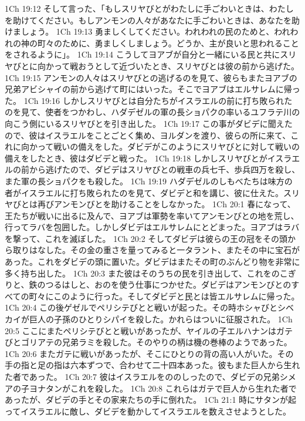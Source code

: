 1Ch 19:12  そして言った、「もしスリヤびとがわたしに手ごわいときは、わたしを助けてください。もしアンモンの人々があなたに手ごわいときは、あなたを助けましょう。
1Ch 19:13  勇ましくしてください。われわれの民のためと、われわれの神の町々のために、勇ましくしましょう。どうか、主が良いと思われることをされるように」。
1Ch 19:14  こうしてヨアブが自分と一緒にいる民と共にスリヤびとに向かって戦おうとして近づいたとき、スリヤびとは彼の前から逃げた。
1Ch 19:15  アンモンの人々はスリヤびとの逃げるのを見て、彼らもまたヨアブの兄弟アビシャイの前から逃げて町にはいった。そこでヨアブはエルサレムに帰った。
1Ch 19:16  しかしスリヤびとは自分たちがイスラエルの前に打ち敗られたのを見て、使者をつかわし、ハダデゼルの軍の長ショパクの率いるユフラテ川の向こう側にいるスリヤびとを引き出した。
1Ch 19:17  この事がダビデに聞えたので、彼はイスラエルをことごとく集め、ヨルダンを渡り、彼らの所に来て、これに向かって戦いの備えをした。ダビデがこのようにスリヤびとに対して戦いの備えをしたとき、彼はダビデと戦った。
1Ch 19:18  しかしスリヤびとがイスラエルの前から逃げたので、ダビデはスリヤびとの戦車の兵七千、歩兵四万を殺し、また軍の長ショパクをも殺した。
1Ch 19:19  ハダデゼルのしもべたちは味方の者がイスラエルに打ち敗られたのを見て、ダビデと和を講じ、彼に仕えた。スリヤびとは再びアンモンびとを助けることをしなかった。
1Ch 20:1  春になって、王たちが戦いに出るに及んで、ヨアブは軍勢を率いてアンモンびとの地を荒し、行ってラバを包囲した。しかしダビデはエルサレムにとどまった。ヨアブはラバを撃って、これを滅ぼした。
1Ch 20:2  そしてダビデは彼らの王の冠をその頭から取りはなした。その金の重さを量ってみると一タラント、またその中に宝石があった。これをダビデの頭に置いた。ダビデはまたその町のぶんどり物を非常に多く持ち出した。
1Ch 20:3  また彼はそのうちの民を引き出して、これをのこぎりと、鉄のつるはしと、おのを使う仕事につかせた。ダビデはアンモンびとのすべての町々にこのように行った。そしてダビデと民とは皆エルサレムに帰った。
1Ch 20:4  この後ゲゼルでペリシテびとと戦いが起った。その時ホシャびとシベカイが巨人の子孫のひとりシパイを殺した。かれらはついに征服された。
1Ch 20:5  ここにまたペリシテびとと戦いがあったが、ヤイルの子エルハナンはガテびとゴリアテの兄弟ラミを殺した。そのやりの柄は機の巻棒のようであった。
1Ch 20:6  またガテに戦いがあったが、そこにひとりの背の高い人がいた。その手の指と足の指は六本ずつで、合わせて二十四本あった。彼もまた巨人から生れた者であった。
1Ch 20:7  彼はイスラエルをののしったので、ダビデの兄弟シメアの子ヨナタンがこれを殺した。
1Ch 20:8  これらはガテで巨人から生れた者であったが、ダビデの手とその家来たちの手に倒れた。
1Ch 21:1  時にサタンが起ってイスラエルに敵し、ダビデを動かしてイスラエルを数えさせようとした。
